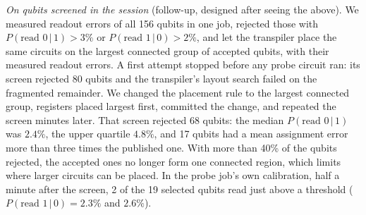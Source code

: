 \documentclass[11pt,a4paper]{article}
\begin{document}
\emph{On qubits screened in the session} (follow-up, designed after seeing
the above). We measured readout errors of all 156 qubits in one job,
rejected those with $P(\text{read }0\,|\,1) > 3\%$ or
$P(\text{read }1\,|\,0) > 2\%$, and let the transpiler place the same
circuits on the largest connected group of accepted qubits, with their
measured readout errors. A first attempt stopped before any probe circuit
ran: its screen rejected 80 qubits and the transpiler's layout search failed
on the fragmented remainder. We changed the placement rule to the largest
connected group, registers placed largest first, committed the change, and
repeated the screen minutes later. That screen rejected 68 qubits: the
median $P(\text{read }0\,|\,1)$ was $2.4\%$, the
upper quartile $4.8\%$, and 17 qubits had a mean assignment error more than
three times the published one. With more than 40\% of the qubits rejected, the accepted ones no
longer form one connected region, which limits where larger circuits can be
placed. In the probe job's own calibration, half a minute after the screen,
2 of the 19 selected qubits read just above a threshold
($P(\text{read }1\,|\,0) = 2.3\%$ and $2.6\%$).
\end{document}
